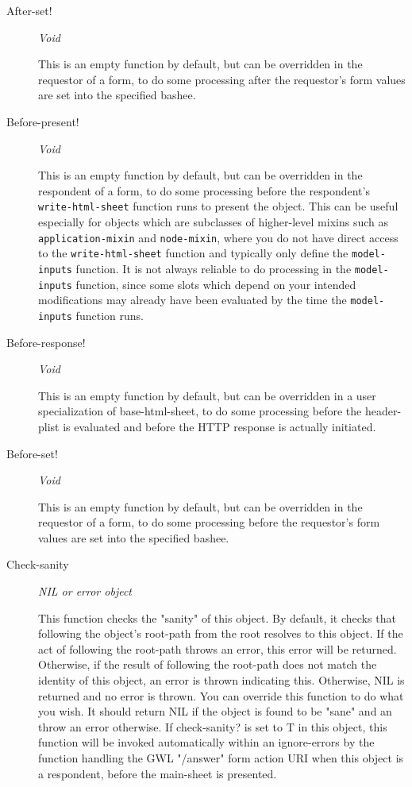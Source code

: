 \documentclass [11pt]{book}
\begin{document}
\begin{itemize}
\begin{description}
\item [After-set!]
\emph{Void}

 This is an empty function by default, but can be overridden in
the requestor of a form, to do some processing after the requestor's form
values are set into the specified bashee.




\item [Before-present!]
\emph{Void}

 This is an empty function by default, but can be overridden in
the respondent of a form, to do some processing before the respondent's
\texttt{write-html-sheet} function runs to present the object. This can be
useful especially for objects which are subclasses of higher-level mixins such as
\texttt{application-mixin} and \texttt{node-mixin}, where you do not have
direct access to the \texttt{write-html-sheet} function and typically only define
the \texttt{model-inputs} function. It is not always reliable to do processing
in the \texttt{model-inputs} function, since some slots which depend on your
intended modifications may already have been evaluated by the time the
\texttt{model-inputs} function runs.




\item [Before-response!]
\emph{Void}

 This is an empty function by default, but can be overridden in
a user specialization of base-html-sheet, to do some processing before the
header-plist is evaluated and before the HTTP response is actually initiated.




\item [Before-set!]
\emph{Void}

 This is an empty function by default, but can be overridden in
the requestor of a form, to do some processing before the requestor's form
values are set into the specified bashee.




\item [Check-sanity]
\emph{NIL or error object}

 This function checks the "sanity" of this object. By
default, it checks that following the object's root-path from the root resolves
to this object. If the act of following the root-path throws an error, this error
will be returned. Otherwise, if the result of following the root-path does not
match the identity of this object, an error is thrown indicating this. Otherwise,
NIL is returned and no error is thrown. You can override this function to do what
you wish. It should return NIL if the object is found to be "sane" and an throw
an error otherwise.
If check-sanity? is set to T in this object, this function will be invoked automatically
within an ignore-errors by the function handling the GWL "/answer" form action URI
when this object is a respondent, before the main-sheet is presented.





\end{description}
\end{itemize}
\end{document}
